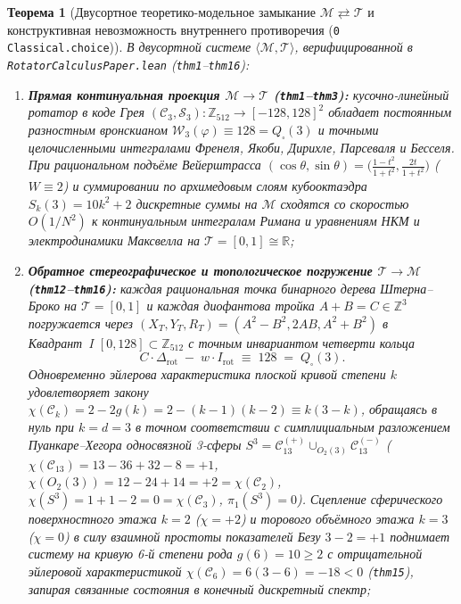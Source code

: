 \documentclass[11pt,a4paper]{article}
\newtheorem{theorem}{Теорема}[section]
\theoremstyle{definition}
\theoremstyle{remark}
\begin{document}
\begin{theorem}[Двусортное теоретико-модельное замыкание $\mathcal{M} \rightleftarrows \mathcal{T}$ и конструктивная невозможность внутреннего противоречия (\texttt{0 Classical.choice})]
\label{thm:bilateral-closure}
В двусортной системе $\langle\mathcal{M},\mathcal{T}\rangle$, верифицированной в \texttt{RotatorCalculusPaper.lean} (\texttt{thm1}--\texttt{thm16}):
\begin{enumerate}[label=\textbf{(\roman*)},leftmargin=*]
\item \textbf{Прямая континуальная проекция $\mathcal{M} \to \mathcal{T}$ (\texttt{thm1}--\texttt{thm3}):}
  кусочно-линейный ротатор в коде Грея $(\mathcal{C}_3,\mathcal{S}_3) : \mathbb{Z}_{512}\to[-128,128]^2$ обладает постоянным разностным вронскианом $\mathcal{W}_3(\varphi) \equiv 128 = Q_\square(3)$ и точными целочисленными интегралами Френеля, Якоби, Дирихле, Парсеваля и Бесселя. При рациональном подъёме Вейерштрасса $(\cos\theta,\sin\theta) = \bigl(\frac{1-t^2}{1+t^2},\frac{2t}{1+t^2}\bigr)$ ($W\equiv 2$) и суммировании по архимедовым слоям кубооктаэдра $S_k(3) = 10k^2 + 2$ дискретные суммы на $\mathcal{M}$ сходятся со скоростью $O(1/N^2)$ к континуальным интегралам Римана и уравнениям НКМ и электродинамики Максвелла на $\mathcal{T} = [0,1]\cong\mathbb{R}$;
\item \textbf{Обратное стереографическое и топологическое погружение $\mathcal{T} \to \mathcal{M}$ (\texttt{thm12}--\texttt{thm16}):}
  каждая рациональная точка бинарного дерева Штерна--Броко на $\mathcal{T} = [0,1]$ и каждая диофантова тройка $A+B=C\in\mathbb{Z}^3$ погружается через $(X_T,Y_T,R_T) = (A^2-B^2,2AB,A^2+B^2)$ в Квадрант~I $[0,128]\subset\mathbb{Z}_{512}$ с точным инвариантом четверти кольца
  \begin{equation}
    \label{eq:quarter-ring-lock}
    C\cdot\Delta_{\mathrm{rot}} \;-\; w\cdot I_{\mathrm{rot}} \;\equiv\; 128 \;=\; Q_\square(3).
  \end{equation}
  Одновременно эйлерова характеристика плоской кривой степени $k$ удовлетворяет закону $\chi(\mathcal{C}_k) = 2-2g(k) = 2-(k-1)(k-2) \equiv k(3-k)$, обращаясь в нуль при $k = d = 3$ в точном соответствии с симплициальным разложением Пуанкаре--Хегора односвязной 3-сферы $S^3 = \mathcal{C}_{13}^{(+)}\cup_{O_2(3)}\mathcal{C}_{13}^{(-)}$ ($\chi(\mathcal{C}_{13}) = 13-36+32-8 = +1$, $\chi(O_2(3)) = 12-24+14 = +2 = \chi(\mathcal{C}_2)$, $\chi(S^3) = 1+1-2 = 0 = \chi(\mathcal{C}_3)$, $\pi_1(S^3)=0$). Сцепление сферического поверхностного этажа $k=2$ ($\chi=+2$) и торового объёмного этажа $k=3$ ($\chi=0$) в силу взаимной простоты показателей Безу $3-2=+1$ поднимает систему на кривую 6-й степени рода $g(6)=10\ge 2$ с отрицательной эйлеровой характеристикой $\chi(\mathcal{C}_6) = 6(3-6) = -18 < 0$ (\texttt{thm15}), запирая связанные состояния в конечный дискретный спектр;

\end{enumerate}
\end{theorem}
\end{document}

